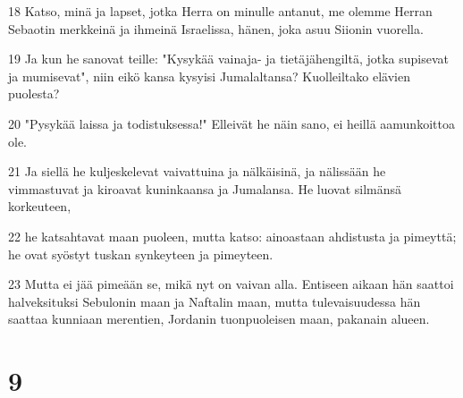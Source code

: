 \par 18 Katso, minä ja lapset, jotka Herra on minulle antanut, me olemme Herran Sebaotin merkkeinä ja ihmeinä Israelissa, hänen, joka asuu Siionin vuorella.
\par 19 Ja kun he sanovat teille: "Kysykää vainaja- ja tietäjähengiltä, jotka supisevat ja mumisevat", niin eikö kansa kysyisi Jumalaltansa? Kuolleiltako elävien puolesta?
\par 20 "Pysykää laissa ja todistuksessa!" Elleivät he näin sano, ei heillä aamunkoittoa ole.
\par 21 Ja siellä he kuljeskelevat vaivattuina ja nälkäisinä, ja nälissään he vimmastuvat ja kiroavat kuninkaansa ja Jumalansa. He luovat silmänsä korkeuteen,
\par 22 he katsahtavat maan puoleen, mutta katso: ainoastaan ahdistusta ja pimeyttä; he ovat syöstyt tuskan synkeyteen ja pimeyteen.
\par 23 Mutta ei jää pimeään se, mikä nyt on vaivan alla. Entiseen aikaan hän saattoi halveksituksi Sebulonin maan ja Naftalin maan, mutta tulevaisuudessa hän saattaa kunniaan merentien, Jordanin tuonpuoleisen maan, pakanain alueen.

\chapter{9}

